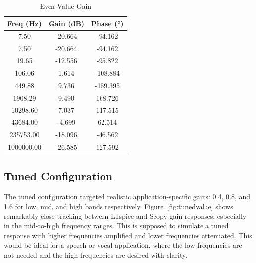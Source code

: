 \documentclass[12pt]{article}
\begin{document}
\begin{table}[H]
	\centering
	\begin{tabular}{|c|c|c|}
		\hline
		\textbf{Freq (Hz)} & \textbf{Gain (dB)} & \textbf{Phase (°)} \\
		\hline
		7.50               & -20.664            & -94.162            \\
		7.50               & -20.664            & -94.162            \\
		19.65              & -12.556            & -95.822            \\
		106.06             & 1.614              & -108.884           \\
		449.88             & 9.736              & -159.395           \\
		1908.29            & 9.490              & 168.726            \\
		10298.60           & 7.037              & 117.515            \\
		43684.00           & -4.699             & 62.514             \\
		235753.00          & -18.096            & -46.562            \\
		1000000.00         & -26.585            & 127.592            \\
		\hline
	\end{tabular}
	\caption{Even Value Gain}
	\label{tab:evenvalue}
\end{table}

\subsection{Tuned Configuration}
The tuned configuration targeted realistic application-specific gains: 0.4, 0.8, and 1.6 for low, mid, and high bands respectively. Figure~\ref{fig:tunedvalue} shows remarkably close tracking between LTspice and Scopy gain responses, especially in the mid-to-high frequency ranges. This is supposed to simulate a tuned response with higher frequencies amplified and lower frequencies attenuated. This would be ideal for a speech or vocal application, where the low frequencies are not needed and the high frequencies are desired with clarity.
\end{document}
